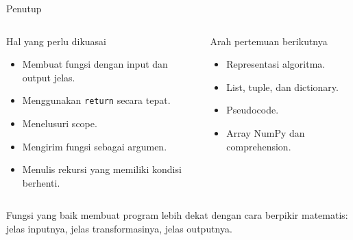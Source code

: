 \documentclass[aspectratio=169,11pt]{beamer}
\begin{document}
\begin{frame}{Penutup}
\begin{columns}[T]
\begin{block}{Hal yang perlu dikuasai}
\begin{itemize}
  \item Membuat fungsi dengan input dan output jelas.
  \item Menggunakan \texttt{return} secara tepat.
  \item Menelusuri scope.
  \item Mengirim fungsi sebagai argumen.
  \item Menulis rekursi yang memiliki kondisi berhenti.
\end{itemize}
\end{block}
\begin{block}{Arah pertemuan berikutnya}
\begin{itemize}
  \item Representasi algoritma.
  \item List, tuple, dan dictionary.
  \item Pseudocode.
  \item Array NumPy dan comprehension.
\end{itemize}
\end{block}
\end{columns}
\vspace{1mm}
\begin{center}
\colorbox{LightTeal}{\parbox{.86\linewidth}{\centering\small Fungsi yang baik membuat program lebih dekat dengan cara berpikir matematis: jelas inputnya, jelas transformasinya, jelas outputnya.}}
\end{center}
\end{frame}
\end{document}
